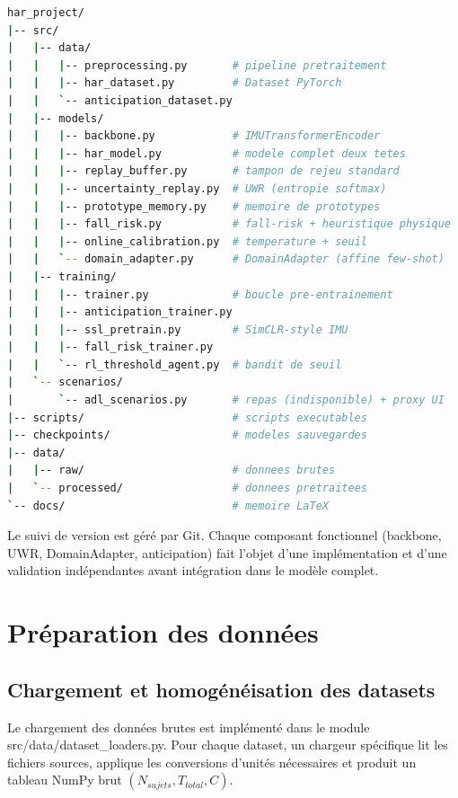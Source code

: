 \begin{lstlisting}[language=bash,caption={Structure du projet \texttt{har\_project/}},label=lst:project_tree]
har_project/
|-- src/
|   |-- data/
|   |   |-- preprocessing.py       # pipeline pretraitement
|   |   |-- har_dataset.py         # Dataset PyTorch
|   |   `-- anticipation_dataset.py
|   |-- models/
|   |   |-- backbone.py            # IMUTransformerEncoder
|   |   |-- har_model.py           # modele complet deux tetes
|   |   |-- replay_buffer.py       # tampon de rejeu standard
|   |   |-- uncertainty_replay.py  # UWR (entropie softmax)
|   |   |-- prototype_memory.py    # memoire de prototypes
|   |   |-- fall_risk.py           # fall-risk + heuristique physique
|   |   |-- online_calibration.py  # temperature + seuil
|   |   `-- domain_adapter.py      # DomainAdapter (affine few-shot)
|   |-- training/
|   |   |-- trainer.py             # boucle pre-entrainement
|   |   |-- anticipation_trainer.py
|   |   |-- ssl_pretrain.py        # SimCLR-style IMU
|   |   |-- fall_risk_trainer.py
|   |   `-- rl_threshold_agent.py  # bandit de seuil
|   `-- scenarios/
|       `-- adl_scenarios.py       # repas (indisponible) + proxy UI
|-- scripts/                       # scripts executables
|-- checkpoints/                   # modeles sauvegardes
|-- data/
|   |-- raw/                       # donnees brutes
|   `-- processed/                 # donnees pretraitees
`-- docs/                          # memoire LaTeX
\end{lstlisting}

Le suivi de version est géré par Git. Chaque composant fonctionnel (backbone, UWR, DomainAdapter, anticipation) fait l'objet d'une implémentation et d'une validation indépendantes avant intégration dans le modèle complet.

\section{Préparation des données}

\subsection{Chargement et homogénéisation des datasets}

Le chargement des données brutes est implémenté dans le module src/data/dataset\_loaders.py. Pour chaque dataset, un chargeur spécifique lit les fichiers sources, applique les conversions d'unités nécessaires et produit un tableau NumPy brut $(N_{sujets}, T_{total}, C)$.

